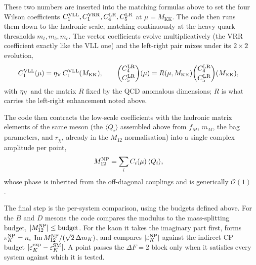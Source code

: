 \documentclass[11pt]{article}
\newcommand{\MKK}{M_{\mathrm{KK}}}
\newcommand{\Mtwelve}{M_{12}}
\newcommand{\ImMtwelve}{\operatorname{Im}M_{12}}
\newcommand{\eps}{\varepsilon}
\newcommand{\dmk}{\Delta m_K}
\newcommand{\epsK}{\varepsilon_K}
\begin{document}
\smallskip
\noindent These two numbers are inserted into the matching formulas above to set
the four Wilson coefficients
$C_1^{\rm VLL},C_1^{\rm VRR},C_4^{\rm LR},C_5^{\rm LR}$ at $\mu=\MKK$. The code then
runs them down to the hadronic scale, matching continuously at the heavy-quark
thresholds $m_t,m_b,m_c$. The vector coefficients evolve multiplicatively (the VRR
coefficient exactly like the VLL one) and the left-right pair mixes under its
$2\times2$ evolution,
\begin{equation}
C_1^{\rm VLL}(\mu)=\eta_{\rm V}\,C_1^{\rm VLL}(\MKK),
\qquad
\binom{C_4^{\rm LR}}{C_5^{\rm LR}}(\mu)
=R(\mu,\MKK)\binom{C_4^{\rm LR}}{C_5^{\rm LR}}(\MKK),
\end{equation}
with $\eta_{\rm V}$ and the matrix $R$ fixed by the QCD anomalous dimensions; $R$ is
what carries the left-right enhancement noted above.

\smallskip
\noindent The code then contracts the low-scale coefficients with the hadronic
matrix elements of the same meson (the $\langle Q_i\rangle$ assembled above from
$f_M$, $m_M$, the bag parameters, and $r_\chi$, already in the $M_{12}$
normalisation) into a single complex amplitude per point,
\begin{equation}
\Mtwelve^{\rm NP}=\sum_i C_i(\mu)\,\langle Q_i\rangle ,
\end{equation}
whose phase is inherited from the off-diagonal couplings and is generically
$\mathcal{O}(1)$.

\smallskip
\noindent The final step is the per-system comparison, using the budgets defined
above. For the $B$ and $D$ mesons the code compares the modulus to the
mass-splitting budget, $|\Mtwelve^{\rm NP}|\le\text{budget}$. For the kaon it takes
the imaginary part first, forms
$\epsK^{\rm NP}=\kappa_\eps\,\ImMtwelve^{\rm NP}/(\sqrt2\,\dmk)$, and compares
$|\epsK^{\rm NP}|$ against the indirect-CP budget
$|\epsK^{\rm exp}-\epsK^{\rm SM}|$. A point passes the $\Delta F=2$ block only when
it satisfies every system against which it is tested.
\end{document}

